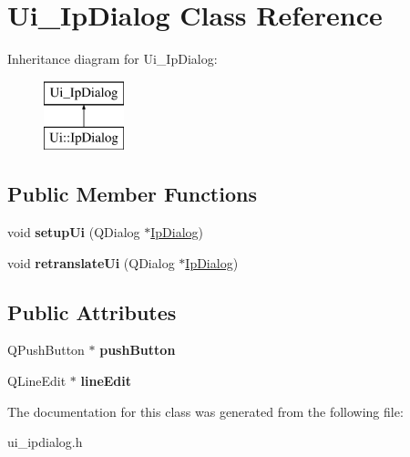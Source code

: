 \hypertarget{class_ui___ip_dialog}{}\section{Ui\+\_\+\+Ip\+Dialog Class Reference}
\label{class_ui___ip_dialog}
Inheritance diagram for Ui\+\_\+\+Ip\+Dialog\+:\begin{figure}[H]
\begin{center}
\leavevmode
\includegraphics[height=2.000000cm]{class_ui___ip_dialog}
\end{center}
\end{figure}
\subsection*{Public Member Functions}
\begin{DoxyCompactItemize}
\item 
\hypertarget{class_ui___ip_dialog_a8fa6dd70ea0b48184c9d299ddc8c8897}{}\label{class_ui___ip_dialog_a8fa6dd70ea0b48184c9d299ddc8c8897} 
void {\bfseries setup\+Ui} (Q\+Dialog $\ast$\hyperlink{class_ip_dialog}{Ip\+Dialog})
\item 
\hypertarget{class_ui___ip_dialog_a72f26d70dbe8b16bf86d5bc47249ae3b}{}\label{class_ui___ip_dialog_a72f26d70dbe8b16bf86d5bc47249ae3b} 
void {\bfseries retranslate\+Ui} (Q\+Dialog $\ast$\hyperlink{class_ip_dialog}{Ip\+Dialog})
\end{DoxyCompactItemize}
\subsection*{Public Attributes}
\begin{DoxyCompactItemize}
\item 
\hypertarget{class_ui___ip_dialog_a6cef9b74bd3cbb89dac46cbb9425635b}{}\label{class_ui___ip_dialog_a6cef9b74bd3cbb89dac46cbb9425635b} 
Q\+Push\+Button $\ast$ {\bfseries push\+Button}
\item 
\hypertarget{class_ui___ip_dialog_af410b16fe28fac2e2cab9a7841ab606a}{}\label{class_ui___ip_dialog_af410b16fe28fac2e2cab9a7841ab606a} 
Q\+Line\+Edit $\ast$ {\bfseries line\+Edit}
\end{DoxyCompactItemize}


The documentation for this class was generated from the following file\+:\begin{DoxyCompactItemize}
\item 
ui\+\_\+ipdialog.\+h\end{DoxyCompactItemize}
